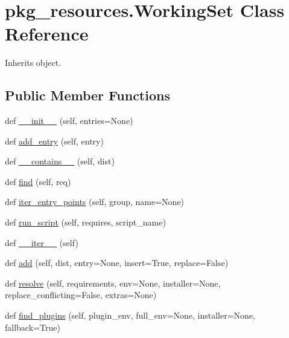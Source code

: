 \hypertarget{classpkg__resources_1_1_working_set}{}\section{pkg\+\_\+resources.\+Working\+Set Class Reference}
\label{classpkg__resources_1_1_working_set}


Inherits object.

\subsection*{Public Member Functions}
\begin{DoxyCompactItemize}
\item 
def \hyperlink{classpkg__resources_1_1_working_set_a88df1aa3c1781fcb4576a56854bab8da}{\+\_\+\+\_\+init\+\_\+\+\_\+} (self, entries=None)
\item 
def \hyperlink{classpkg__resources_1_1_working_set_aed20abcb6a85cdc25dff1686ad480958}{add\+\_\+entry} (self, entry)
\item 
def \hyperlink{classpkg__resources_1_1_working_set_a6a4880a5d32dac95a7b93f03f7ebc5b9}{\+\_\+\+\_\+contains\+\_\+\+\_\+} (self, dist)
\item 
def \hyperlink{classpkg__resources_1_1_working_set_a4eb8b69f25d05e0edb4f2a8d162d096b}{find} (self, req)
\item 
def \hyperlink{classpkg__resources_1_1_working_set_a556736951f3aa317fa2d339d64e290ea}{iter\+\_\+entry\+\_\+points} (self, group, name=None)
\item 
def \hyperlink{classpkg__resources_1_1_working_set_ab2b93a4b8818042f319d7f9d7d2884bf}{run\+\_\+script} (self, requires, script\+\_\+name)
\item 
def \hyperlink{classpkg__resources_1_1_working_set_a59bda285ab373ec1cc8b22b0e24c460c}{\+\_\+\+\_\+iter\+\_\+\+\_\+} (self)
\item 
def \hyperlink{classpkg__resources_1_1_working_set_ab12bd19b39a01d6013544ab543401a16}{add} (self, dist, entry=None, insert=True, replace=False)
\item 
def \hyperlink{classpkg__resources_1_1_working_set_a38c13850cc73d319b4bcf47592132941}{resolve} (self, requirements, env=None, installer=None, replace\+\_\+conflicting=False, extras=None)
\item 
def \hyperlink{classpkg__resources_1_1_working_set_a5a8cbb91286691870d04edd6c841197d}{find\+\_\+plugins} (self, plugin\+\_\+env, full\+\_\+env=None, installer=None, fallback=True)

\end{DoxyCompactItemize}
